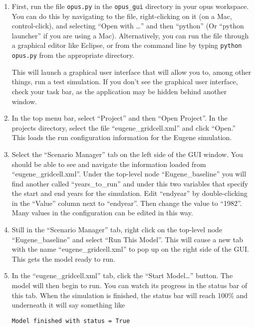 \documentclass{howto}
\begin{document}
\begin{enumerate}

\item First, run the file \verb|opus.py| in the \verb|opus_gui| directory
in your opus workspace.  You can do this by navigating to the file,
right-clicking on it (on a Mac, control-click), and selecting ``Open with
\dots'' and then ``python'' (Or ``python launcher'' if you are using a
Mac).  Alternatively, you can run the file through a graphical editor like
Eclipse, or from the command line by typing \verb|python opus.py| from the
appropriate directory.

This will launch a graphical user interface that will allow you to, among
other things, run a test simulation.  If you don't see the graphical user
interface, check your task bar, as the application may be hidden behind
another window.

\item In the top menu bar, select ``Project'' and then ``Open Project''.  In the projects directory, select the file ``eugene_gridcell.xml'' and click ``Open.''  This loads the run configuration information for the Eugene simulation.

\item Select the ``Scenario Manager'' tab on the left side of the GUI window.  You should be able to see and navigate the information loaded from ``eugene_gridcell.xml''.  Under the top-level node ``Eugene_baseline'' you will find another called ``years_to_run'' and under this two variables that specify the start and end years for the simulation.  Edit ``endyear'' by double-clicking in the ``Value'' column next to ``endyear''.  Then change the value to ``1982''.  Many values in the configuration can be edited in this way.

\item Still in the ``Scenario Manager'' tab, right click on the top-level node ``Eugene_baseline'' and select ``Run This Model''.  This will cause a new tab with the name ``eugene_gridcell.xml'' to pop up on the right side of the GUI.  This gets the model ready to run.

\item In the ``eugene_gridcell.xml'' tab, click the ``Start Model\ldots''
button.  The model will then begin to run. You can watch its progress in
the status bar of this tab.  
When the simulation is finished,
the status bar will reach 100\% and underneath it will say something like
\begin{verbatim}Model finished with status = True\end{verbatim}

\end{enumerate}
\end{document}
